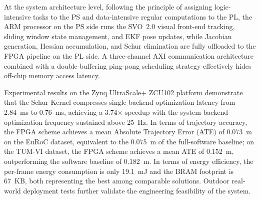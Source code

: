 At the system architecture level, following the principle of assigning logic-intensive tasks to the PS and data-intensive regular computations to the PL, the ARM processor on the PS side runs the SVO~2.0 visual front-end tracking, sliding window state management, and EKF pose updates, while Jacobian generation, Hessian accumulation, and Schur elimination are fully offloaded to the FPGA pipeline on the PL side. A three-channel AXI communication architecture combined with a double-buffering ping-pong scheduling strategy effectively hides off-chip memory access latency.

Experimental results on the Zynq UltraScale+ ZCU102 platform demonstrate that the Schur Kernel compresses single backend optimization latency from 2.84~ms to 0.76~ms, achieving a 3.74$\times$ speedup with the system backend optimization frequency sustained above 25~Hz. In terms of trajectory accuracy, the FPGA scheme achieves a mean Absolute Trajectory Error (ATE) of 0.073~m on the EuRoC dataset, equivalent to the 0.075~m of the full-software baseline; on the TUM-VI dataset, the FPGA scheme achieves a mean ATE of 0.152~m, outperforming the software baseline of 0.182~m. In terms of energy efficiency, the per-frame energy consumption is only 19.1~mJ and the BRAM footprint is 67~KB, both representing the best among comparable solutions. Outdoor real-world deployment tests further validate the engineering feasibility of the system.

